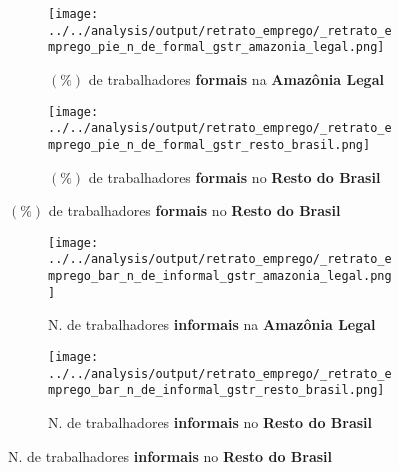 \documentclass[11pt]{beamer}
\begin{document}
\begin{frame}[label=_retrato_emprego_pie_n_de_formal_gstr]{}
\textit{\hyperlink{indice_principal}{}}
\begin{figure}
\centering
\begin{subfigure}{.5\textwidth}
  \centering
  \texttt{[image: ../../analysis/output/retrato\_emprego/\_retrato\_emprego\_pie\_n\_de\_formal\_gstr\_amazonia\_legal.png]}
  \label{fig:_retrato_emprego_pie_n_de_formal_gstr_amazonia_legal}
  \caption{{\tiny $(\%)$ de trabalhadores \textbf{formais} na \textbf{Amazônia Legal}}}
\end{subfigure}%
\begin{subfigure}{.5\textwidth}
  \centering
  \texttt{[image: ../../analysis/output/retrato\_emprego/\_retrato\_emprego\_pie\_n\_de\_formal\_gstr\_resto\_brasil.png]}
  \label{fig:_retrato_emprego_pie_n_de_formal_gstr_resto_brasil}
   \caption{{\tiny $(\%)$ de trabalhadores \textbf{formais} no \textbf{Resto do Brasil}}}
\end{subfigure}
\end{figure}
\end{frame}


\begin{frame}[label=_retrato_emprego_bar_n_de_informal_gstr]{}
\textit{\hyperlink{indice_principal}{}}
\begin{figure}
\centering
\begin{subfigure}{.5\textwidth}
  \centering
  \texttt{[image: ../../analysis/output/retrato\_emprego/\_retrato\_emprego\_bar\_n\_de\_informal\_gstr\_amazonia\_legal.png]}
  \label{fig:_retrato_emprego_bar_n_de_informal_gstr_amazonia_legal}
  \caption{{\tiny N. de trabalhadores \textbf{informais} na \textbf{Amazônia Legal}}}
\end{subfigure}%
\begin{subfigure}{.5\textwidth}
  \centering
  \texttt{[image: ../../analysis/output/retrato\_emprego/\_retrato\_emprego\_bar\_n\_de\_informal\_gstr\_resto\_brasil.png]}
  \label{fig:_retrato_emprego_bar_n_de_informal_gstr_resto_brasil}
   \caption{{\tiny N. de trabalhadores \textbf{informais} no \textbf{Resto do Brasil}}}
\end{subfigure}
\end{figure}
\end{frame}
\end{document}
